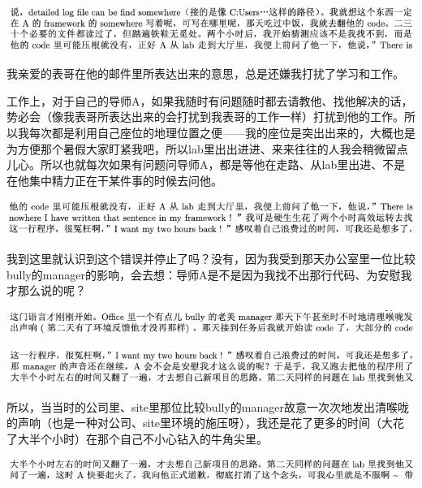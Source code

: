 \documentclass[9pt, b5paper]{article}
\begin{document}
\begin{center}
\includegraphics[width=.9\linewidth]{./pic/backups_plans_20210512_201310.png}
\end{center}

我亲爱的表哥在他的邮件里所表达出来的意思，总是还嫌我打扰了学习和工作。

工作上，对于自己的导师A，如果我随时有问题随时都去请教他、找他解决的话，势必会（像我表哥所表达出来的会打扰到我表哥的工作一样）打扰到他的工作。所以我每次都是利用自己座位的地理位置之便——我的座位是突出出来的，大概也是为方便那个暑假大家盯紧我吧，所以lab里出出进进、来来往往的人我会稍微留点儿心。所以也就每次如果有问题问导师A，都是等他在走路、从lab里出进、不是在他集中精力正在干某件事的时候去问他。 

\begin{center}
\includegraphics[width=.9\linewidth]{./pic/backups_plans_20210512_201747.png}
\end{center}

我到这里就认识到这个错误并停止了吗？没有，因为我受到那天办公室里一位比较bully的manager的影响，会去想：导师A是不是因为我找不出那行代码、为安慰我才那么说的呢？

\begin{center}
\includegraphics[width=.9\linewidth]{./pic/backups_plans_20210512_201913.png}
\end{center}

\begin{center}
\includegraphics[width=.9\linewidth]{./pic/backups_plans_20210512_201928.png}
\end{center}

所以，当当时的公司里、site里那位比较bully的manager故意一次次地发出清喉咙的声响（也是一种对公司、site里环境的施压呀），我还是花了更多的时间（大花了大半个小时）在那个自己不小心钻入的牛角尖里。 

\begin{center}
\includegraphics[width=.9\linewidth]{./pic/backups_plans_20210512_202114.png}
\end{center}
\end{document}
